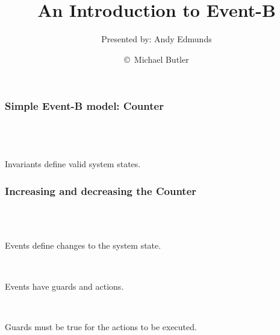 \documentclass{beamer}
\title{An Introduction to Event-B}
\subtitle{Presented by: Andy Edmunds}
\author{\copyright\ Michael Butler}
\institute{ University of Southampton }
\begin{document}
\begin{frame}

\titlepage

\end{frame}




\begin{frame}


\frametitle{Simple  Event-B model: Counter }

\ENDC\\

~\\

 \\

Invariants define \alert{valid} system states.





\end{frame}





\begin{frame}

\frametitle{Increasing and decreasing the Counter }


\operations

\begin{columns}
\begin{column}{2in}
\end{column}
\begin{column}{2in}
\end{column}
\end{columns}

~\\

~\\

Events define \alert{changes} to the system state.

~

Events have \alert{guards} and \alert{actions}.

~

Guards must be true for the actions to be executed.


\end{frame}
\end{document}
